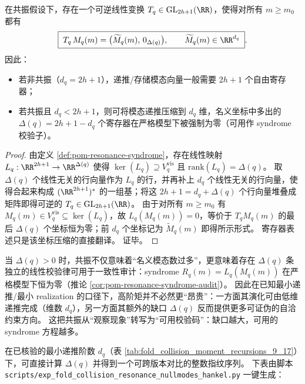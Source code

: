 \begin{corollary}\label{cor:pom-resonance-register-savings}
在共振假设下，存在一个可逆线性变换 \(T_q\in\mathrm{GL}_{2h+1}(\RR)\)，使得对所有 \(m\ge m_0\) 都有
\[
\boxed{\;
T_q\,M_q(m)=\bigl(\widetilde M_q(m),\,0_{\Delta(q)}\bigr),\qquad
\widetilde M_q(m)\in\RR^{d_q}\; }.
\]
因此：
\begin{itemize}
  \item 若非共振（\(d_q=2h+1\)），递推/存储模态向量一般需要 \(2h+1\) 个自由寄存器；
  \item 若共振且 \(d_q<2h+1\)，则可将模态递推压缩到 \(d_q\) 维，名义坐标中多出的 \(\Delta(q)=2h+1-d_q\) 个寄存器在严格模型下被强制为零（可用作 syndrome 校验子）。
\end{itemize}
\end{corollary}
\begin{proof}
由定义 \ref{def:pom-resonance-syndrome}，存在线性映射 \(L_q:\RR^{2h+1}\to\RR^{\Delta(q)}\) 使得 \(\ker(L_q)\supseteq V_q^{\mathrm{vis}}\) 且 \(\mathrm{rank}(L_q)=\Delta(q)\)。
取 \(\Delta(q)\) 个线性无关的行向量作为 \(L_q\) 的行，并再补上 \(d_q\) 个线性无关的行向量，使得合起来构成 \((\RR^{2h+1})^\ast\) 的一组基；将这 \(2h+1=d_q+\Delta(q)\) 个行向量堆叠成矩阵即得可逆的 \(T_q\in\mathrm{GL}_{2h+1}(\RR)\)。
由于对所有 \(m\ge m_0\) 有 \(M_q(m)\in V_q^{\mathrm{vis}}\subseteq\ker(L_q)\)，故
\(
L_q(M_q(m))=0
\)，等价于 \(T_q M_q(m)\) 的最后 \(\Delta(q)\) 个坐标恒为零；前 \(d_q\) 个坐标记为 \(\widetilde M_q(m)\) 即得所示形式。
寄存器表述只是该坐标压缩的直接翻译。
证毕。
\end{proof}

\begin{remark}\label{rem:pom-resonance-as-resource}
当 \(\Delta(q)>0\) 时，共振不仅意味着“名义模态数过多”，更意味着存在 \(\Delta(q)\) 条独立的线性校验律可用于一致性审计：syndrome \(R_q(m)=L_q(M_q(m))\) 在严格模型下恒为零（推论 \ref{cor:pom-resonance-syndrome-audit}）。
因此在已知最小递推/最小 realization 的口径下，高阶矩并不必然更“昂贵”：一方面其演化可由低维递推完成（维数 \(d_q\)），另一方面其额外的缺口 \(\Delta(q)\) 反而提供更多可证伪的自洽约束方向。
这把共振从“观察现象”转写为“可用校验码”：缺口越大，可用的 syndrome 方程越多。
\end{remark}

\begin{remark}[已核验窗口内的 \texorpdfstring{$\Delta(q)$}{Delta(q)} 读数（\(q=9,\dots,17\)）]\label{rem:pom-delta-q9-17}
在已核验的最小递推阶数 \(d_q\)（表 \ref{tab:fold_collision_moment_recursions_9_17}）下，可直接计算 \(\Delta(q)\) 并得到一个可跨版本对比的整数指纹序列。
下表由脚本 \texttt{scripts/exp\_fold\_collision\_resonance\_nullmodes\_hankel.py} 一键生成：
\end{remark}

